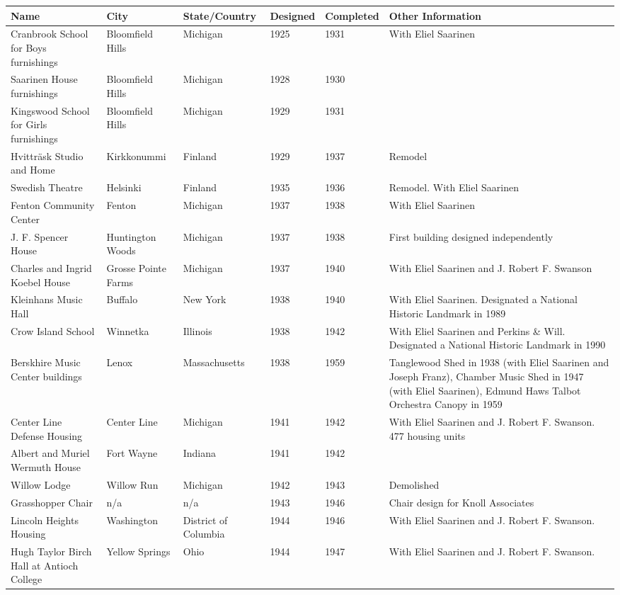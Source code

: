 \documentclass{article}
\begin{document}
\begin{tabular}{llllll}
\toprule
Name & City & State/Country & Designed & Completed & Other Information \\
\midrule
Cranbrook School for Boys furnishings & Bloomfield Hills & Michigan & 1925 & 1931 & With Eliel Saarinen \\
Saarinen House furnishings & Bloomfield Hills & Michigan & 1928 & 1930 &  \\
Kingswood School for Girls furnishings & Bloomfield Hills & Michigan & 1929 & 1931 &  \\
Hvitträsk Studio and Home & Kirkkonummi & Finland & 1929 & 1937 & Remodel \\
Swedish Theatre & Helsinki & Finland & 1935 & 1936 & Remodel. With Eliel Saarinen \\
Fenton Community Center & Fenton & Michigan & 1937 & 1938 & With Eliel Saarinen \\
J. F. Spencer House & Huntington Woods & Michigan & 1937 & 1938 & First building designed independently \\
Charles and Ingrid Koebel House & Grosse Pointe Farms & Michigan & 1937 & 1940 & With Eliel Saarinen and J. Robert F. Swanson \\
Kleinhans Music Hall & Buffalo & New York & 1938 & 1940 & With Eliel Saarinen. Designated a National Historic Landmark in 1989 \\
Crow Island School & Winnetka & Illinois & 1938 & 1942 & With Eliel Saarinen and Perkins \& Will. Designated a National Historic Landmark in 1990 \\
Berskhire Music Center buildings & Lenox & Massachusetts & 1938 & 1959 & Tanglewood Shed in 1938 (with Eliel Saarinen and Joseph Franz), Chamber Music Shed in 1947 (with Eliel Saarinen), Edmund Haws Talbot Orchestra Canopy in 1959 \\
Center Line Defense Housing & Center Line & Michigan & 1941 & 1942 & With Eliel Saarinen and J. Robert F. Swanson. 477 housing units \\
Albert and Muriel Wermuth House & Fort Wayne & Indiana & 1941 & 1942 &  \\
Willow Lodge & Willow Run & Michigan & 1942 & 1943 & Demolished \\
Grasshopper Chair & n/a & n/a & 1943 & 1946 & Chair design for Knoll Associates \\
Lincoln Heights Housing & Washington & District of Columbia & 1944 & 1946 & With Eliel Saarinen and J. Robert F. Swanson. \\
Hugh Taylor Birch Hall at Antioch College & Yellow Springs & Ohio & 1944 & 1947 & With Eliel Saarinen and J. Robert F. Swanson. \\

\end{tabular}
\end{document}
